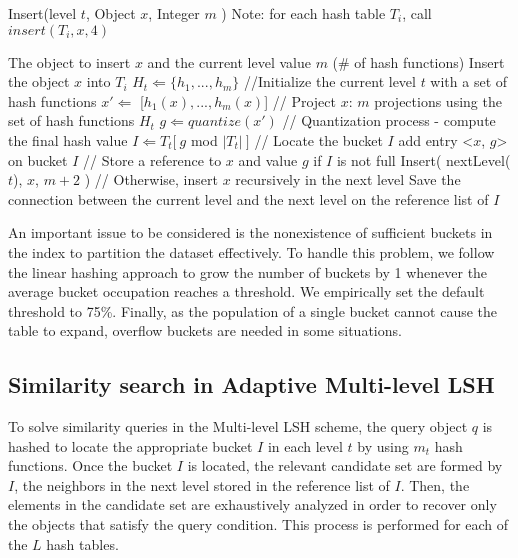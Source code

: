 \begin{algorithm}
\caption{Insert(level $t$, Object $x$, Integer $m$ ) Note: for each hash table $T_i$, call $insert(T_i, x,4)$}\label{fig:lsh_insert}
    \begin{algorithmic}[1]
    \REQUIRE  The object to insert $x$ and the current level value $m$ (\# of hash functions)
    \ENSURE   Insert the object $x$ into $T_i$
        \STATE $H_t \Leftarrow \{h_1,...,h_{m}\}$  //Initialize the current level $t$ with a set of hash functions
    \ENDIF
    \STATE $x' \Leftarrow $ [$h_1(x),...,h_{m}(x)$] // Project $x$: $m$ projections using the set of hash functions $H_t$
    \STATE $g \Leftarrow quantize( x' )$ // Quantization process - compute the final hash value
    \STATE $I \Leftarrow T_t[\  g $ mod $ | T_t |\ ]$   // Locate the bucket $I$
        \STATE add entry <$x$, $g$> on bucket $I$ // Store a reference to $x$ and value $g$ if $I$ is not full
    \ELSE
       \STATE Insert( nextLevel($t$), $x$, $m + 2$ ) // Otherwise, insert $x$ recursively in the next level
       \STATE Save the connection between the current level and the next level on the reference list of $I$
    \ENDIF
\end{algorithmic}
\label{fig:mllshconstruction}
\end{algorithm}

An important issue to be considered is the nonexistence of sufficient buckets in the index to partition the dataset effectively. To handle this problem, we follow the linear hashing approach \cite{linearHashing} to grow the number of buckets by 1 whenever the average bucket occupation reaches a threshold. We empirically set the default threshold to  75\%. Finally, as the population of a single bucket cannot cause the table to expand, overflow buckets are needed in some situations.



\subsection{Similarity search in Adaptive Multi-level LSH}

To solve similarity queries in the Multi-level LSH scheme, the query object $q$ is hashed to locate the appropriate bucket $I$ in each level $t$ by using $m_t$ hash functions. Once the bucket $I$ is located, the relevant candidate set are formed by $I$, the neighbors in the next level stored in the reference list of  $I$.  Then, the elements in the candidate set are exhaustively analyzed in order to recover only the objects that satisfy the query condition. This process is performed for each of the $L$ hash tables.

